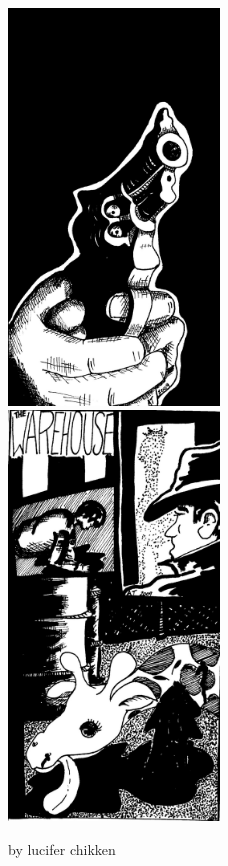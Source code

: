 \begin{figure}[b]
  \includegraphics[width=0.5\textwidth]{art/lucifer_chikken-Gun1.jpg}
  \includegraphics[width=0.5\textwidth]{art/lucifer_chikken-Warehouse.jpg}
  \caption{by lucifer chikken}
\end{figure}
